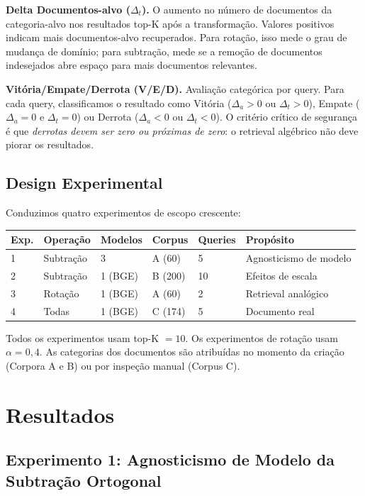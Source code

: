 \documentclass{article}
\begin{document}
\textbf{Delta Documentos-alvo ($\Delta_t$).} O aumento no número de documentos da categoria-alvo nos resultados top-K após a transformação. Valores positivos indicam mais documentos-alvo recuperados. Para rotação, isso mede o grau de mudança de domínio; para subtração, mede se a remoção de documentos indesejados abre espaço para mais documentos relevantes.

\textbf{Vitória/Empate/Derrota (V/E/D).} Avaliação categórica por query. Para cada query, classificamos o resultado como Vitória ($\Delta_a > 0$ ou $\Delta_t > 0$), Empate ($\Delta_a = 0$ e $\Delta_t = 0$) ou Derrota ($\Delta_a < 0$ ou $\Delta_t < 0$). O critério crítico de segurança é que \emph{derrotas devem ser zero ou próximas de zero}: o retrieval algébrico não deve piorar os resultados.

\subsection{Design Experimental}

Conduzimos quatro experimentos de escopo crescente:

\begin{table}[h]
\centering
\begin{tabular}{llllll}
\toprule
Exp. & Operação & Modelos & Corpus & Queries & Propósito \\
\midrule
1 & Subtração & 3 & A (60) & 5 & Agnosticismo de modelo \\
2 & Subtração & 1 (BGE) & B (200) & 10 & Efeitos de escala \\
3 & Rotação & 1 (BGE) & A (60) & 2 & Retrieval analógico \\
4 & Todas & 1 (BGE) & C (174) & 5 & Documento real \\
\bottomrule
\end{tabular}
\end{table}

Todos os experimentos usam top-K $= 10$. Os experimentos de rotação usam $\alpha = 0{,}4$. As categorias dos documentos são atribuídas no momento da criação (Corpora A e B) ou por inspeção manual (Corpus C).

\section{Resultados}

\subsection{Experimento 1: Agnosticismo de Modelo da Subtração Ortogonal}
\end{document}
